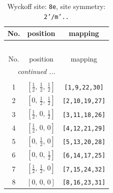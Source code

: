\documentclass[fleqn,8pt]{jsarticle}
\begin{document}
\renewcommand{\arraystretch}{1.2}
\begin{longtable}{ccc}
\caption{Wyckoff site: {\tt 8e}, site symmetry: {\tt 2'/m'..}}
 \\
 \hline \hline
No. & position & mapping \\ \hline \endfirsthead

\multicolumn{2}{l}{\tablename\ \thetable{}} \\
 \hline \hline
No. & position & mapping \\ \hline \endhead

 \hline \hline
\multicolumn{2}{r}{\footnotesize\it continued ...} \\ \endfoot

 \hline \hline
\multicolumn{2}{r}{} \\ \endlastfoot

1 & $\left[ \frac{1}{2},\, \frac{1}{2},\, \frac{1}{2} \right]$ & {\tt [1,9,22,30]} \\ \hline
2 & $\left[ 0,\, \frac{1}{2},\, \frac{1}{2} \right]$ & {\tt [2,10,19,27]} \\ \hline
3 & $\left[ \frac{1}{2},\, 0,\, \frac{1}{2} \right]$ & {\tt [3,11,18,26]} \\ \hline
4 & $\left[ \frac{1}{2},\, 0,\, 0 \right]$ & {\tt [4,12,21,29]} \\ \hline
5 & $\left[ 0,\, \frac{1}{2},\, 0 \right]$ & {\tt [5,13,20,28]} \\ \hline
6 & $\left[ 0,\, 0,\, \frac{1}{2} \right]$ & {\tt [6,14,17,25]} \\ \hline
7 & $\left[ \frac{1}{2},\, \frac{1}{2},\, 0 \right]$ & {\tt [7,15,24,32]} \\ \hline
8 & $\left[ 0,\, 0,\, 0 \right]$ & {\tt [8,16,23,31]} \\
\end{longtable}
\renewcommand{\arraystretch}{1.2}
\end{document}
